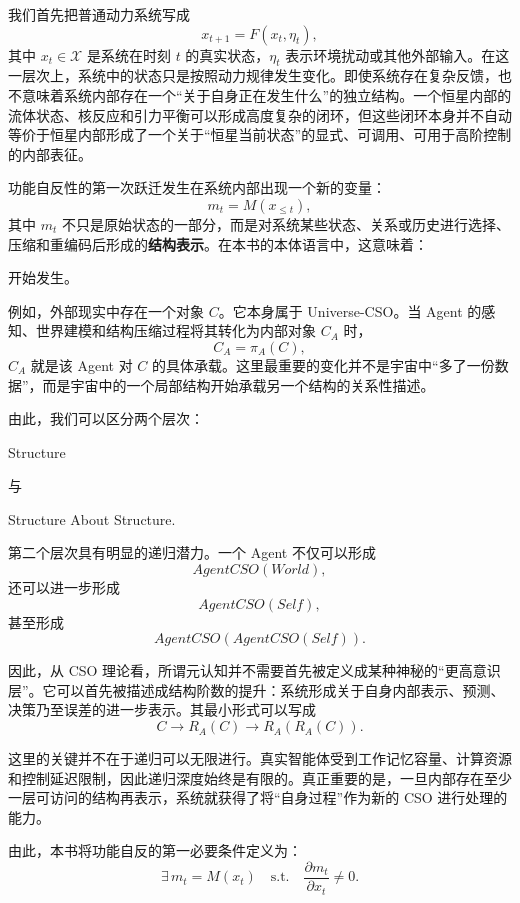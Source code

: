 我们首先把普通动力系统写成
\[
x_{t+1}=F(x_t,\eta_t),
\]
其中 \(x_t\in\mathcal X\) 是系统在时刻 \(t\) 的真实状态，\(\eta_t\) 表示环境扰动或其他外部输入。在这一层次上，系统中的状态只是按照动力规律发生变化。即使系统存在复杂反馈，也不意味着系统内部存在一个“关于自身正在发生什么”的独立结构。一个恒星内部的流体状态、核反应和引力平衡可以形成高度复杂的闭环，但这些闭环本身并不自动等价于恒星内部形成了一个关于“恒星当前状态”的显式、可调用、可用于高阶控制的内部表征。

功能自反性的第一次跃迁发生在系统内部出现一个新的变量：
\[
m_t=M(x_{\leq t}),
\]
其中 \(m_t\) 不只是原始状态的一部分，而是对系统某些状态、关系或历史进行选择、压缩和重编码后形成的\textbf{结构表示}。在本书的本体语言中，这意味着：
\begin{statementbox}
\centering
{}
\end{statementbox}
开始发生。

例如，外部现实中存在一个对象 \(C\)。它本身属于 Universe-CSO。当 Agent 的感知、世界建模和结构压缩过程将其转化为内部对象 \(C_A\) 时，
\[
C_A=\pi_A(C),
\]
\(C_A\) 就是该 Agent 对 \(C\) 的具体承载。这里最重要的变化并不是宇宙中“多了一份数据”，而是宇宙中的一个局部结构开始承载另一个结构的关系性描述。

由此，我们可以区分两个层次：
\begin{statementbox}
Structure
\end{statementbox}
与
\begin{statementbox}
Structure About Structure.
\end{statementbox}

第二个层次具有明显的递归潜力。一个 Agent 不仅可以形成
\[
AgentCSO(World),
\]
还可以进一步形成
\[
AgentCSO(Self),
\]
甚至形成
\[
AgentCSO\!\left(AgentCSO(Self)\right).
\]

因此，从 CSO 理论看，所谓元认知并不需要首先被定义成某种神秘的“更高意识层”。它可以首先被描述成结构阶数的提升：系统形成关于自身内部表示、预测、决策乃至误差的进一步表示。其最小形式可以写成
\[
C
\rightarrow
R_A(C)
\rightarrow
R_A(R_A(C)).
\]

这里的关键并不在于递归可以无限进行。真实智能体受到工作记忆容量、计算资源和控制延迟限制，因此递归深度始终是有限的。真正重要的是，一旦内部存在至少一层可访问的结构再表示，系统就获得了将“自身过程”作为新的 CSO 进行处理的能力。

由此，本书将功能自反的第一必要条件定义为：
\[
\boxed{
\exists\,m_t=M(x_t)
\quad\text{s.t.}\quad
\frac{\partial m_t}{\partial x_t}\neq 0.
}
\]

